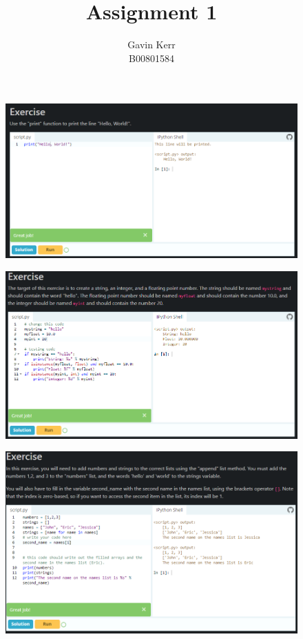 \documentclass[12pt, a4paper]{article}
\title{Assignment 1}
\author{Gavin Kerr\\B00801584}
\begin{document}
\maketitle

\begin{figure}[h]
\centering
\includegraphics[width=6in]{images/q1.png}
\end{figure}
\pagebreak
\begin{figure}[h]
\centering
\includegraphics[width=6in]{images/q2.png}
\end{figure}
\pagebreak
\begin{figure}[h]
\centering
\includegraphics[width=6in]{images/q3.png}
\end{figure}
\end{document}
